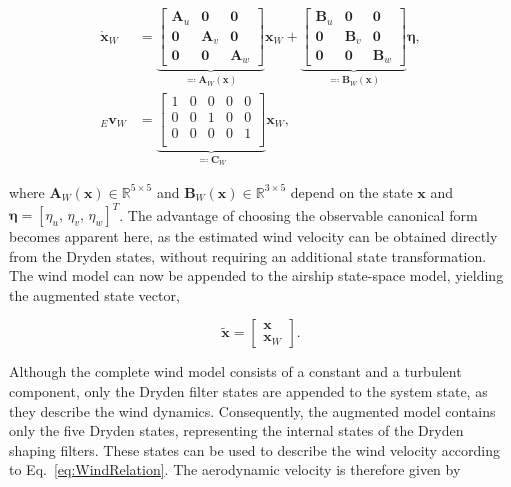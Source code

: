 \begin{align}
	\dot{\bm{x}}_W
	&=
	\underbrace{
		\begin{bmatrix}
			\bm{A}_u & \bm{0} & \bm{0}\\
			\bm{0} & \bm{A}_v & \bm{0}\\
			\bm{0} & \bm{0} & \bm{A}_w
		\end{bmatrix}
	}_{\eqqcolon \bm{A}_W(\bm{x})}
	\bm{x}_W
	+
	\underbrace{
		\begin{bmatrix}
			\bm{B}_u & \bm{0} & \bm{0}\\
			\bm{0} & \bm{B}_v & \bm{0}\\
			\bm{0} & \bm{0} & \bm{B}_w
		\end{bmatrix}
	}_{\eqqcolon \bm{B}_W(\bm{x})}
	\bm{\eta},
	\\[8pt]
	{}_E\bm{v}_{W}
	&=
	\underbrace{
		\begin{bmatrix}
			1 & 0 & 0 & 0 & 0 \\
			0 & 0 & 1 & 0 & 0 \\
			0 & 0 & 0 & 0 & 1 \\
		\end{bmatrix}
	}_{\eqqcolon \bm{C}_W}
	\bm{x}_W,
	\label{eq:WindRelation}
\end{align}

where $\bm{A}_W(\bm{x}) \in \mathbb{R}^{5 \times 5}$ and $\bm{B}_W(\bm{x}) \in \mathbb{R}^{3 \times 5}$ depend on the state $\bm{x}$ and $\bm{\eta} = [\eta_u, \, \eta_v, \, \eta_w]^T$.
The advantage of choosing the observable canonical form becomes apparent here, as the estimated wind velocity can be obtained directly from the Dryden states, without requiring an additional state transformation.
The wind model can now be appended to the airship state-space model, yielding the augmented state vector,

\begin{equation}
	\tilde{\bm{x}} 
	=
	\begin{bmatrix}
		\bm{x} \\ \bm{x}_W
	\end{bmatrix}.
\end{equation}

Although the complete wind model consists of a constant and a turbulent component, only the Dryden filter states are appended to the system state, as they describe the wind dynamics. Consequently, the augmented model contains only the five Dryden states, representing the internal states of the Dryden shaping filters. These states can be used to describe the wind velocity according to Eq.~\eqref{eq:WindRelation}. The aerodynamic velocity is therefore given by

